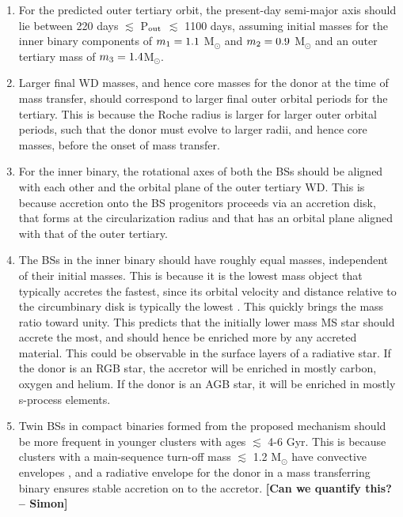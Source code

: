 \documentclass{aastex62}
\def\simon#1{{\bf {\color{red}[#1 -- Simon]}}}
\begin{document}
\begin{enumerate}

\item For the predicted outer tertiary orbit, the present-day
  semi-major axis should lie between 220 days $\lesssim$ P$_{\rm out}$
  $\lesssim$ 1100 days, assuming initial masses for the inner binary
  components of $m_{\rm 1} = 1.1$ M$_{\odot}$ and $m_{\rm 2} = 0.9$
  M$_{\odot}$ and an outer tertiary mass of $m_{\rm 3} = 1.4
  $M$_{\odot}$.

\item Larger final WD masses, and hence core masses for the donor at
  the time of mass transfer, should correspond to larger final outer
  orbital periods for the tertiary.  This is because the Roche radius
  is larger for larger outer orbital periods, such that the donor must
  evolve to larger radii, and hence core masses, before the onset of
  mass transfer.

\item For the inner binary, the rotational axes of both the BSs should
  be aligned with each other and the orbital plane of the outer
  tertiary WD.  This is because accretion onto the BS progenitors
  proceeds via an accretion disk, that forms at the circularization
  radius and that has an orbital plane aligned with that of the outer
  tertiary.

\item The BSs in the inner binary should have roughly equal masses,
  independent of their initial masses.  This is because it is the
  lowest mass object that typically accretes the fastest, since its
  orbital velocity and distance relative to the circumbinary disk is
  typically the lowest
  \citep[e.g.][]{kroupa95,bate97,bate00,haiman09,bate12,farris15,rafikov16,kelley17}.
  This quickly brings the mass ratio toward unity.  This predicts that
  the initially lower mass MS star should accrete the most, and should
  hence be enriched more by any accreted material.  This could be
  observable in the surface layers of a radiative star.  If the donor
  is an RGB star, the accretor will be enriched in mostly carbon,
  oxygen and helium.  If the donor is an AGB star, it will be enriched
  in mostly s-process elements.

\item Twin BSs in compact binaries formed from the proposed mechanism
  should be more frequent in younger clusters with ages $\lesssim$ 4-6
  Gyr.  This is because clusters with a main-sequence turn-off mass
  $\lesssim$ 1.2 M$_{\odot}$ have convective envelopes
  \citep[e.g.][]{iben91,maedoer09}, and a radiative envelope for the
  donor in a mass transferring binary ensures stable accretion on to
  the accretor.  \simon{Can we quantify this?}

\end{enumerate}
\end{document}
